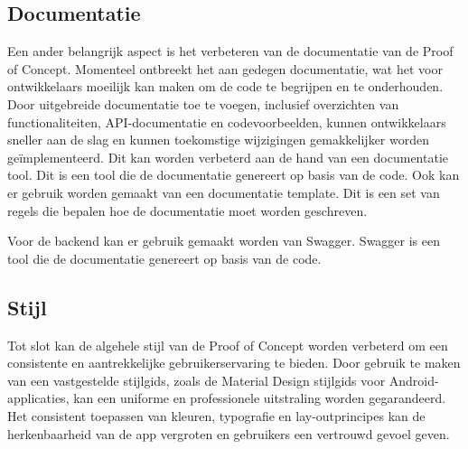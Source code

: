 \subsection{Documentatie}

Een ander belangrijk aspect is het verbeteren van de documentatie van de Proof of Concept. 
Momenteel ontbreekt het aan gedegen documentatie, wat het voor ontwikkelaars moeilijk kan maken om de code te begrijpen en te onderhouden. Door uitgebreide documentatie toe te voegen, inclusief overzichten van functionaliteiten, API-documentatie en codevoorbeelden, kunnen ontwikkelaars sneller aan de slag en kunnen toekomstige wijzigingen gemakkelijker worden geïmplementeerd. Dit kan worden verbeterd aan de hand van een documentatie tool. Dit is een tool die de documentatie genereert op basis van de code. Ook kan er gebruik worden gemaakt van een documentatie template. Dit is een set van regels die bepalen hoe de documentatie moet worden geschreven.

Voor de backend kan er gebruik gemaakt worden van Swagger. Swagger is een tool die de documentatie genereert op basis van de code. 

\subsection{Stijl}

Tot slot kan de algehele stijl van de Proof of Concept worden verbeterd om een consistente en aantrekkelijke gebruikerservaring te bieden. Door gebruik te maken van een vastgestelde stijlgids, zoals de Material Design stijlgids voor Android-applicaties, kan een uniforme en professionele uitstraling worden gegarandeerd. Het consistent toepassen van kleuren, typografie en lay-outprincipes kan de herkenbaarheid van de app vergroten en gebruikers een vertrouwd gevoel geven.

